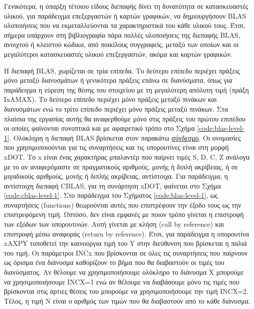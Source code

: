 Γενικότερα, η ύπαρξη τέτοιου είδους διεπαφής δίνει τη δυνατότητα σε κατασκευαστές υλικού, για παράδειγμα επεξεργαστών ή καρτών γραφικών, να δημιουργήσουν BLAS υλοποιήσεις που να εκμεταλλεύονται τα χαρακτηριστικά του κάθε υλικού τους. Έτσι, σήμερα υπάρχουν στη βιβλιογραφία πάρα πολλές υλοποιήσεις της διεπαφής BLAS, ανοιχτού ή κλειστού κώδικα, από ποικίλους συγγραφείς, μεταξύ των οποίων και οι μεγαλύτεροι κατασκευαστές υλικού επεξεργαστών, ακόμα και καρτών γραφικών.

Η διεπαφή BLAS, χωρίζεται σε τρία επίπεδα. Το δεύτερο επίπεδο περιέχει πράξεις μόνο μεταξύ διανυσμάτων ή γενικότερα πράξεις επάνω σε διανύσματα, όπως για παράδειγμα η εύρεση της θέσης του στοιχείου με τη μεγαλύτερη απόλυτη τιμή (πράξη IxAMAX). Το δεύτερο επίπεδο περιέχει μόνο πράξεις μεταξύ πινάκων και διανυσμάτων ενώ το τρίτο επίπεδο περιέχει μόνο πράξεις μεταξύ πινάκων. Στα πλαίσια της εργασίας αυτής θα αναφερθούμε μόνο στις πράξεις του πρώτου επιπέδου οι οποίες φαίνονται συνοπτικά και με αφαιρετικό τρόπο στο Σχήμα \ref{code:blas-level-1}. Ολόκληρη η διεπαφή BLAS βρίσκεται στον παρακάτω \href{https://netlib.org/lapack/explore-html/de/da0/cblas_8h_source.html}{σύνδεσμο}. Οι ονομασίες που χρησιμοποιούνται για τις συναρτήσεις και τις υπορουτίνες είναι στη μορφή xDOT. Το x είναι ένας χαρακτήρας μπαλαντέρ που παίρνει τιμές S, D, C, Z ανάλογα με το αν αναφερόμαστε σε πραγματικούς αριθμούς, μονής ή διπλή ακρίβειας, ή σε μιγαδικούς αριθμούς, μονής ή διπλής ακρίβειας, αντίστοιχα. Για παράδειγμα, η αντίστοιχη διεπαφή CBLAS, για τη συνάρτηση xDOT, φαίνεται στο Σχήμα \ref{code:cblas-level-1}. Στο παράδειγμα του Σχήματος \ref{code:blas-level-1}, ως συναρτήσεις (functions) θεωρούνται αυτές που επιστρέφουν την έξοδο τους ως την επιστρεφόμενη τιμή. Ωστόσο, δεν είναι εμφανές με ποιον τρόπο γίνεται η επιστροφή των εξόδων των υπορουτινών. Αυτή γίνεται με κλήση (call by reference) και επιστροφή μέσω αναφοράς (return by reference). Έτσι, για παράδειγμα η υπορουτίνα xAXPY τοποθετεί την καινούργια τιμή του Y στην διεύθυνση που βρίσκεται η παλιά του τιμή. Οι παράμετροι INCx που βρίσκονται σε όλες τις συναρτήσεις που παίρνουν ως όρισμα ένα διάνυσμα καθορίζουν το βήμα που θα διαβαστούν οι τιμές του διανύσματος. Αν θέλουμε να χρησιμοποιήσουμε ολόκληρο το διάνυσμα X μπορούμε να χρησιμοποιήσουμε INCX=1 ενώ αν θέλουμε να διαβάσουμε μόνο τις τιμές που βρίσκονται στις άρτιες θέσεις του μπορούμε να χρησιμοποιήσουμε την τιμή INCX=2. Τέλος, η τιμή N είναι ο αριθμός των τιμών που θα διαβαστούν από το κάθε διάνυσμα.

